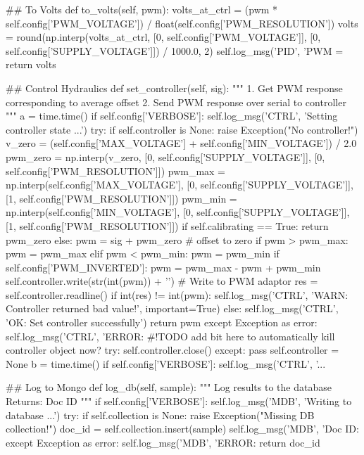 \begin{python}
    ## To Volts
    def to_volts(self, pwm):
        volts_at_ctrl = (pwm * self.config['PWM_VOLTAGE']) / float(self.config['PWM_RESOLUTION'])
        volts = round(np.interp(volts_at_ctrl, [0, self.config['PWM_VOLTAGE']], [0, self.config['SUPPLY_VOLTAGE']]) / 1000.0, 2)  
        self.log_msg('PID', 'PWM = %
        return volts

    ## Control Hydraulics
    def set_controller(self, sig):
        """
        1. Get PWM response corresponding to average offset
        2. Send PWM response over serial to controller
        """
        a = time.time()
        if self.config['VERBOSE']: self.log_msg('CTRL', 'Setting controller state ...')
        try:            
            if self.controller is None: raise Exception("No controller!")
            v_zero = (self.config['MAX_VOLTAGE'] + self.config['MIN_VOLTAGE']) / 2.0
            pwm_zero = np.interp(v_zero, [0, self.config['SUPPLY_VOLTAGE']], [0, self.config['PWM_RESOLUTION']])
            pwm_max = np.interp(self.config['MAX_VOLTAGE'], [0, self.config['SUPPLY_VOLTAGE']], [1, self.config['PWM_RESOLUTION']])
            pwm_min = np.interp(self.config['MIN_VOLTAGE'], [0, self.config['SUPPLY_VOLTAGE']], [1, self.config['PWM_RESOLUTION']])
            if self.calibrating == True:
                return pwm_zero
            else:
                pwm = sig + pwm_zero # offset to zero
                if pwm > pwm_max:
                    pwm = pwm_max
                elif pwm < pwm_min:
                    pwm = pwm_min
                if self.config['PWM_INVERTED']:
                    pwm = pwm_max - pwm + pwm_min
                self.controller.write(str(int(pwm)) + '\n') # Write to PWM adaptor
                res = self.controller.readline()
                if int(res) != int(pwm):
                    self.log_msg('CTRL', 'WARN: Controller returned bad value!', important=True)
                else:
                    self.log_msg('CTRL', 'OK: Set controller successfully')
                return pwm
        except Exception as error:
            self.log_msg('CTRL', 'ERROR: %
            #!TODO add bit here to automatically kill controller object now?
            try:
                self.controller.close()
            except:
                pass
            self.controller = None
        b = time.time()
        if self.config['VERBOSE']: self.log_msg('CTRL', '... %
    
    ## Log to Mongo
    def log_db(self, sample):
        """
        Log results to the database
        Returns: Doc ID
        """
        if self.config['VERBOSE']: self.log_msg('MDB', 'Writing to database ...')
        try:          
            if self.collection is None: raise Exception("Missing DB collection!")
            doc_id = self.collection.insert(sample)
            self.log_msg('MDB', 'Doc ID: %
        except Exception as error:
            self.log_msg('MDB', 'ERROR: %
        return doc_id
    

\end{python}
